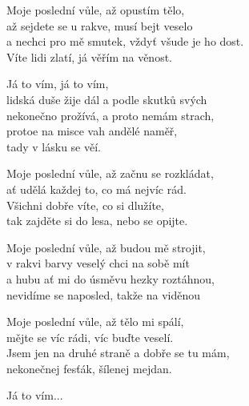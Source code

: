 
\ve{}
Moje poslední vůle,
až opustím tělo,\\
až sejdete se u rakve,
musí bejt veselo\\
a nechci pro mě smutek,
vždyť všude je ho dost.\\
Víte lidi zlatí,
já věřím na věnost.

\cho{}
Já to vím,
já to vím,\\
lidská duše žije dál
a podle skutků svých\\
nekonečno prožívá,
a proto nemám strach,\\
protoe na misce vah
andělé naměř,\\
tady v lásku se věí.

\ve{}
Moje poslední vůle,
až začnu se rozkládat,\\
ať udělá každej to,
co má nejvíc rád.\\
Všichni dobře víte,
co si dlužíte,\\
tak zajděte si do lesa,
nebo se opijte.

\cho{}

\ve{}
Moje poslední vůle,
až budou mě strojit,\\
v rakvi barvy veselý
chci na sobě mít\\
a hubu ať mi do úsměvu
hezky roztáhnou,\\
nevidíme se naposled,
takže na viděnou

\cho{}

\ve{}
Moje poslední vůle,
až tělo mi spálí,\\
mějte se víc rádi,
víc buďte veselí.\\
Jsem jen na druhé straně
a dobře se tu mám,\\
nekonečnej fesťák,
šílenej mejdan.

\cho{}

Já to vím...

\esong